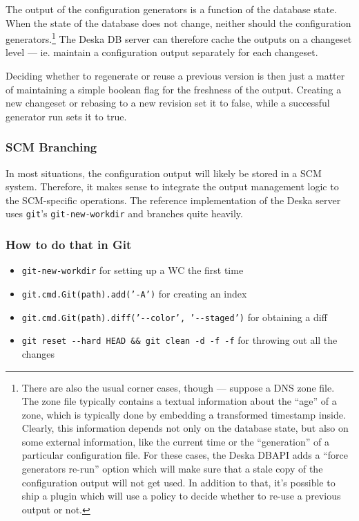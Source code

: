 \documentclass[deska]{subfiles}
\begin{document}
The output of the configuration generators is a function of the database state.  When the state of the database does not
change, neither should the configuration generators.\footnote{There are also the usual corner cases, though --- suppose a
DNS zone file.  The zone file typically contains a textual information about the ``age'' of a zone, which is typically
done by embedding a transformed timestamp inside.  Clearly, this information depends not only on the database state, but
also on some external information, like the current time or the ``generation'' of a particular configuration file.  For
these cases, the Deska DBAPI adds a ``force generators re-run'' option which will make sure that a stale copy of the
configuration output will not get used.  In addition to that, it's possible to ship a plugin which will use a policy to
decide whether to re-use a previous output or not.}  The Deska DB server can therefore cache the outputs on a changeset
level --- ie. maintain a configuration output separately for each changeset.

Deciding whether to regenerate or reuse a previous version is then just a matter of maintaining a simple boolean flag
for the freshness of the output.  Creating a new changeset or rebasing to a new revision set it to false, while a
successful generator run sets it to true.

\subsubsection{SCM Branching}

In most situations, the configuration output will likely be stored in a SCM system.  Therefore, it makes sense to
integrate the output management logic to the SCM-specific operations.  The reference implementation of the Deska server
uses {\tt git}'s {\tt git-new-workdir} and branches quite heavily.

\subsubsection{How to do that in Git}

\begin{itemize}
    \item {\tt git-new-workdir} for setting up a WC the first time
    \item {\tt git.cmd.Git(path).add('-A')} for creating an index
    \item {\tt git.cmd.Git(path).diff('-{-}color', '-{-}staged')} for obtaining a diff
    \item {\tt git reset -{-}hard HEAD \&\& git clean -d -f -f} for throwing out all the changes
\end{itemize}
\end{document}
